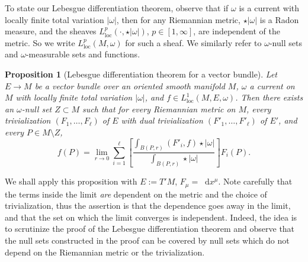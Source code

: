 \documentclass[reqno,11pt]{amsart}
\newcommand*\dif{\mathop{}\!\mathrm{d}}
\newcommand{\loc}{\mathrm{loc}}
\newtheorem{proposition}[theorem]{Proposition}
\theoremstyle{definition}
\numberwithin{equation}{section}
\begin{document}
To state our Lebesgue differentiation theorem, observe that if $\omega$ is a current with locally finite total variation $|\omega|$, then for any Riemannian metric, $\star|\omega|$ is a Radon measure, and the sheaves $L^p_\loc(\cdot, \star |\omega|)$, $p \in [1, \infty]$, are independent of the metric.
So we write $L^p_\loc(M, \omega)$ for such a sheaf.
We similarly refer to $\omega$-null sets and $\omega$-measurable sets and functions.

\begin{proposition}[Lebesgue differentiation theorem for a vector bundle]\label{LebesgueDiff}
Let $E \to M$ be a vector bundle over an oriented smooth manifold $M$, $\omega$ a current on $M$ with locally finite total variation $|\omega|$, and $f \in L^1_\loc(M, E, \omega)$.
Then there exists an $\omega$-null set $Z \subset M$ such that for every Riemannian metric on $M$, every trivialization $(F_1, \dots, F_\ell)$ of $E$ with dual trivialization $(F'_1, \dots, F'_\ell)$ of $E'$, and every $P \in M \setminus Z$,
$$f(P) = \lim_{r \to 0} \sum_{i=1}^\ell \left[\frac{\int_{B(P, r)} (F'_i, f) \star |\omega|}{\int_{B(P, r)} \star |\omega|}\right] F_i(P).$$
\end{proposition}

We shall apply this proposition with $E := T'M$, $F_\mu = \dif x^\mu$.
Note carefully that the terms inside the limit \emph{are} dependent on the metric and the choice of trivialization, thus the assertion is that the dependence goes away in the limit, and that the set on which the limit converges is independent.
Indeed, the idea is to scrutinize the proof of the Lebesgue differentiation theorem \cite[Chapter 3, Theorem 1.3]{stein2009real} and observe that the null sets constructed in the proof can be covered by null sets which do not depend on the Riemannian metric or the trivialization.
\end{document}

